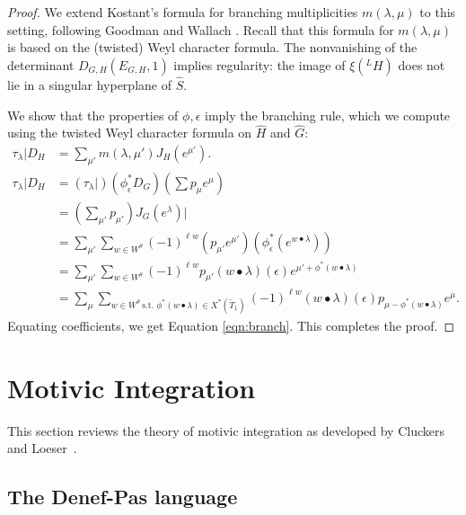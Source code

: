 \begin{proof}
We  extend Kostant's formula for branching multiplicities $m(\lambda,\mu)$ to this setting, following
 Goodman and Wallach \cite[\S8.2.2]{goodman}.   
Recall that this formula for $m(\lambda,\mu)$ is based on the (twisted) Weyl character formula.
The nonvanishing of the determinant
$D_{G,H}(E_{G,H},1)$ implies regularity:  the image of $\xi({}^LH)$ does not lie in a singular hyperplane
of $\hat S$.


We show that the  properties of $\phi,\epsilon$ imply the branching rule, which we compute
using the twisted Weyl character formula on $\hat H$ and $\hat G$:
\begin{align*}
\tau_\lambda| D_H&= \sum_{\mu'} m(\lambda,{\mu'}) J_H(e^{\mu'}).\\
\tau_\lambda| D_H &= (\tau_\lambda|) (\phi^*_\epsilon D_{G}) (\sum p_\mu e^\mu)\\
  &= (\sum_{\mu'} p_{\mu'}) J_G(e^\lambda)|\\
  &= \sum_{\mu'} \sum_{w\in W^\theta} (-1)^{\ell w} (p_{\mu'} e^{\mu'}) (\phi^*_\epsilon (e^{w\bullet \lambda}))\\
  &= \sum_{\mu'} \sum_{w\in W^\theta} (-1)^{\ell w} p_{\mu'} ({w\bullet\lambda})(\epsilon) e^{\mu'+\phi^*(w\bullet \lambda)}\\
  &= \sum_\mu \sum_{w\in W^\theta~\text{s.t. }\phi^*({w\bullet\lambda})\in X^*(\tilde T_1)} (-1)^{\ell w} ({w\bullet\lambda})(\epsilon) p_{\mu - \phi^*({w\bullet \lambda})} e^\mu.
\end{align*}
Equating coefficients, we get Equation \ref{eqn:branch}.
This completes the proof.
\end{proof}

\newpage

\section{Motivic Integration}

This section reviews the theory of motivic integration as developed by Cluckers and
Loeser~\cite{cluckers2008constructible}.  

\subsection{The Denef-Pas language}

